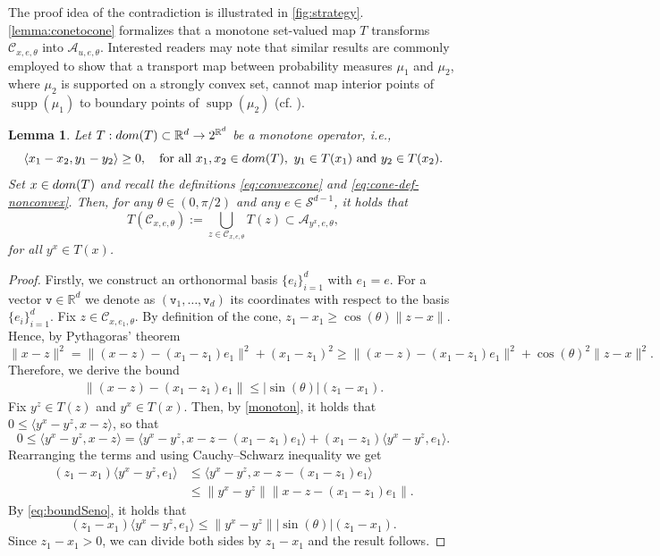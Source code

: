 \documentclass[11pt]{article}
\DeclareMathOperator{\supp}{supp}
\newcommand{\R}{\mathbb{R}}
\theoremstyle{plain}
\newtheorem{lemma}[sectioncount]{Lemma}
\theoremstyle{definition}
\begin{document}
The proof idea of the contradiction is illustrated in \autoref{fig:strategy}.   \autoref{lemma:conetocone} formalizes that a monotone set-valued map $T$ transforms $\mathcal{C}_{x,e, \theta}$ into $ \mathcal{A}_{u,e, \theta}$. Interested readers may note that similar results are commonly employed to show that a transport map between probability measures $\mu_1$ and $\mu_2$, where $\mu_2$
  is supported on a strongly convex set, cannot map interior points of  $\supp(\mu_1)$ to boundary points of $\supp(\mu_2)$ (cf. \cite{CorderoErausquinFigalli.2019,delBarrioGonzalezHallin.2020}). 
%
\begin{lemma}\label{lemma:conetocone}
     Let $T:{\rm dom}(T)\subset \R^d\to 2^{\R^d}$ be a monotone operator, i.e., 
     \begin{equation}
         \label{monoton}
         \langle x_1-x_2, y_1-y_2\rangle\geq 0, \quad \text{for all } x_1,x_2\in {\rm dom}(T),\ y_1\in T(x_1) \ \text{and}\  y_2\in T(x_2) .
     \end{equation}
    Set $ x\in  {\rm dom}(T) $ and  {recall the definitions \eqref{eq:convexcone} and \eqref{eq:cone-def-nonconvex}.} Then, for any  $\theta\in (0, \pi/2)$ and any $e\in \mathcal{S}^{d-1}$, it holds that $$T(\mathcal{C}_{x,e, \theta}):=\bigcup_{z\in\mathcal{C}_{x,e, \theta} } T(z)\subset \mathcal{A}_{y^x,e, \theta},$$
    for all $y^x\in T(x)$. 
 \end{lemma}
 \begin{proof}
Firstly, we construct an  orthonormal basis $\{e_i\}_{i=1}^d$ with $e_1=e$. For a vector $\mathtt{v}\in\mathbb{R}^d$ we denote as $(\mathtt{v}_1, \dots, \mathtt{v}_d)$ its coordinates  with respect to  the basis $\{e_i\}_{i=1}^d$.     Fix $z\in \mathcal{C}_{x,e_1, \theta} $. By definition of the cone,   $z_1-x_1\geq \cos(\theta) \|z-x\|$.      {Hence, by Pythagoras' theorem 
$$\|x-z\|^2=\|(x-z)-(x_1-z_1)e_1\|^2+ (x_1-z_1)^2 \geq \|(x-z)-(x_1-z_1)e_1\|^2+ \cos(\theta)^2 \|z-x\|^2.  $$
Therefore, we derive the bound  
\begin{align}\label{eq:boundSeno}
   \|(x-z)-(x_1-z_1)e_1\|\leq  {|\sin(\theta)|}  (z_1-x_1).
\end{align}}
Fix $y^z\in T(z)$ and $y^x\in T(x)$. Then, by \eqref{monoton}, it holds that $0\leq \langle y^x-y^z, x-z\rangle$,   so that 
$$ 0\leq \langle y^x-y^z, x-z\rangle =  \langle y^x-y^z, x-z-(x_1-z_1)e_1\rangle+(x_1-z_1)\langle y^x-y^z, e_1\rangle.$$
Rearranging the terms and using  Cauchy–Schwarz inequality we get 
\begin{align*}
    (z_1-x_1)\langle y^x-y^z, e_1\rangle&\leq   \langle y^x-y^z, x-z-(x_1-z_1)e_1\rangle\\
    &\leq \| y^x-y^z\| \|x-z-(x_1-z_1)e_1\|.
\end{align*}
By \eqref{eq:boundSeno}, it holds that 
\begin{equation*}
    (z_1-x_1)\langle y^x-y^z, e_1\rangle\leq \| y^x-y^z\|  {|\sin(\theta)|}  (z_1-x_1) {.}
\end{equation*}
Since $z_1-x_1>0$,  {we can divide both sides by $z_1-x_1$} and the result follows.
 \end{proof}
\end{document}
